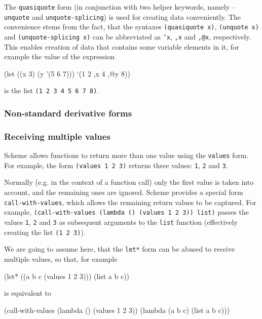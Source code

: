 The \texttt{quasiquote} form (in conjunction with two helper keywords,
namely -- \texttt{unquote} and \texttt{unquote-splicing}) is used
for creating data conveniently. The convenience stems from the fact,
that the syntaxes \texttt{(quasiquote x)}, \texttt{(unquote x)} and
\texttt{(unquote-splicing x)} can be abbreviated as \texttt{`x},
\texttt{,x} and \texttt{,@x}, respectively. This enables creation
of data that contains some variable elements in it, for example the
value of the expression
\begin{Snippet}
(let ((x 3)
      (y '(5 6 7)))
  `(1 2 ,x 4 ,@y 8))
\end{Snippet}
is the list \texttt{(1 2 3 4 5 6 7 8)}.

\subsubsection{Non-standard derivative forms}

\subsubsection{Receiving multiple values}

Scheme allows functions to return more than one value using the
\texttt{values} form. For example, the form \texttt{(values 1 2 3)}
returns three values: \texttt{1}, \texttt{2} and \texttt{3}.

Normally (e.g. in the context of a function call) only the first
value is taken into account, and the remaining ones are ignored.
Scheme provides a special form \texttt{call-with-values},
which allows the remaining return values to be captured. For example,
\texttt{(call-with-values (lambda () (values 1 2 3)) list)} passes
the values \texttt{1}, \texttt{2} and \texttt{3} as subsequent arguments
to the \texttt{list} function (effectively creating the list \texttt{(1 2 3)}).

We are going to assume here, that the \texttt{let*} form can be abused
to receive multiple values\cite{SRFI-71}, so that, for example

\begin{Snippet}
(let* ((a b c (values 1 2 3)))
  (list a b c))
\end{Snippet}

is equivalent to

\begin{Snippet}
(call-with-values
  (lambda () (values 1 2 3))
  (lambda (a b c) (list a b c)))
\end{Snippet}

